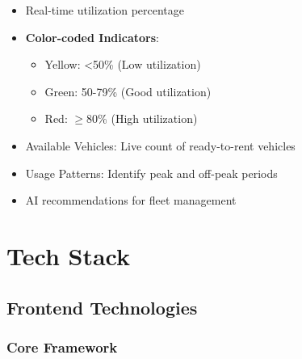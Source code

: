 \documentclass[12pt,a4paper]{article}
\begin{document}
\begin{itemize}[leftmargin=*]
    \item Real-time utilization percentage
    \item \textbf{Color-coded Indicators}:
    \begin{itemize}
        \item Yellow: <50\% (Low utilization)
        \item Green: 50-79\% (Good utilization)
        \item Red: $\geq$80\% (High utilization)
    \end{itemize}
    \item Available Vehicles: Live count of ready-to-rent vehicles
    \item Usage Patterns: Identify peak and off-peak periods
    \item AI recommendations for fleet management
\end{itemize}

\section{Tech Stack}

\subsection{Frontend Technologies}

\subsubsection{Core Framework}
\end{document}

